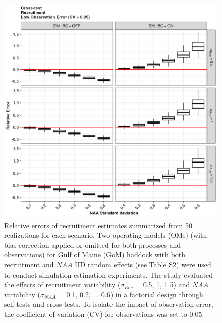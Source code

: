 \documentclass[
  12pt,
]{article}
\begin{document}
\begin{figure}[H]
\centering
\includegraphics[width=\textwidth]{Original_Figures&Tables/Recruitment_low_cross_RE.PNG}
\caption{Relative errors of recruitment estimates summarized from 50 realizations for each scenario. Two operating models (OMs) (with bias correction applied or omitted for both processes and observations) for Gulf of Maine (GoM) haddock with both recruitment and $NAA$ IID random effects (see Table S2) were used to conduct simulation-estimation experiments. The study evaluated the effects of recruitment variability ($\sigma_{Rec}$ = 0.5, 1, 1.5) and $NAA$ variability ($\sigma_{NAA}$ = 0.1, 0.2, ... 0.6) in a factorial design through self-tests and cross-tests. To isolate the impact of observation error, the coefficient of variation (CV) for observations was set to 0.05.}
\label{fig:supp_Recruitment_low_cross_RE}
\end{figure}
\end{document}
